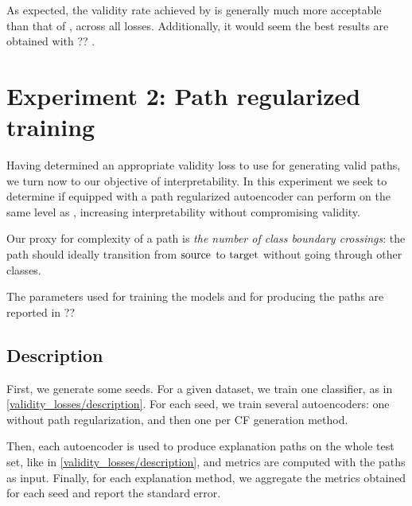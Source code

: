 \documentclass[../main.tex]{subfiles}
\begin{document}
As expected, the validity rate achieved by \revise{} is generally much more acceptable than that of \ls{}, across all losses.
Additionally, it would seem the best results are obtained with ?? .

\section{Experiment 2: Path regularized training}
\label{exp/path_reg}

Having determined an appropriate validity loss to use for generating valid paths, we turn now to our objective of interpretability.
In this experiment we seek to determine if \ls{} equipped with a path regularized autoencoder can perform on the same level as \revise{}, increasing interpretability without compromising validity.

Our proxy for complexity of a path is \emph{the number of class boundary crossings}:
the path should ideally transition from $\mathrm{source}$ to $\mathrm{target}$ without going through other classes.

The parameters used for training the models and for producing the paths are reported in ?? 

\subsection{Description}

First, we generate some seeds.
For a given dataset, we train one classifier, as in \autoref{validity_losses/description}.
For each seed, we train several autoencoders: one without path regularization, and then one per CF generation method.

Then, each autoencoder is used to produce explanation paths on the whole test set, like in \autoref{validity_losses/description}, and metrics are computed with the paths as input.
Finally, for each explanation method, we aggregate the metrics obtained for each seed and report the standard error.




\end{document}
